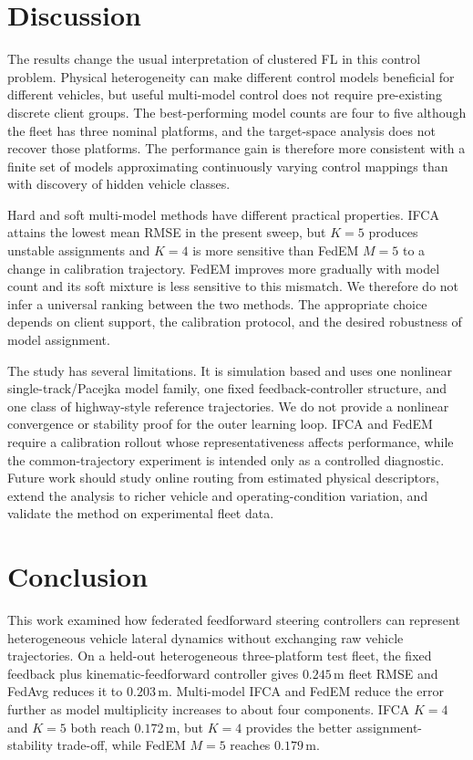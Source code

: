 \section{Discussion}
\label{sec:discussion}
The results change the usual interpretation of clustered FL in this control problem.
Physical heterogeneity can make different control models beneficial for different vehicles, but useful multi-model control does not require pre-existing discrete client groups.
The best-performing model counts are four to five although the fleet has three nominal platforms, and the target-space analysis does not recover those platforms.
The performance gain is therefore more consistent with a finite set of models approximating continuously varying control mappings than with discovery of hidden vehicle classes.

Hard and soft multi-model methods have different practical properties.
IFCA attains the lowest mean RMSE in the present sweep, but $K=5$ produces unstable assignments and $K=4$ is more sensitive than FedEM $M=5$ to a change in calibration trajectory.
FedEM improves more gradually with model count and its soft mixture is less sensitive to this mismatch.
We therefore do not infer a universal ranking between the two methods. The appropriate choice depends on client support, the calibration protocol, and the desired robustness of model assignment.

The study has several limitations.
It is simulation based and uses one nonlinear single-track/Pacejka model family, one fixed feedback-controller structure, and one class of highway-style reference trajectories.
We do not provide a nonlinear convergence or stability proof for the outer learning loop.
IFCA and FedEM require a calibration rollout whose representativeness affects performance, while the common-trajectory experiment is intended only as a controlled diagnostic.
Future work should study online routing from estimated physical descriptors, extend the analysis to richer vehicle and operating-condition variation, and validate the method on experimental fleet data.

\section{Conclusion}
\label{sec:conclusion}
This work examined how federated feedforward steering controllers can represent heterogeneous vehicle lateral dynamics without exchanging raw vehicle trajectories.
On a held-out heterogeneous three-platform test fleet, the fixed feedback plus kinematic-feedforward controller gives $0.245\,\mathrm{m}$ fleet RMSE and FedAvg reduces it to $0.203\,\mathrm{m}$.
Multi-model IFCA and FedEM reduce the error further as model multiplicity increases to about four components.
IFCA $K=4$ and $K=5$ both reach $0.172\,\mathrm{m}$, but $K=4$ provides the better assignment-stability trade-off, while FedEM $M=5$ reaches $0.179\,\mathrm{m}$.

